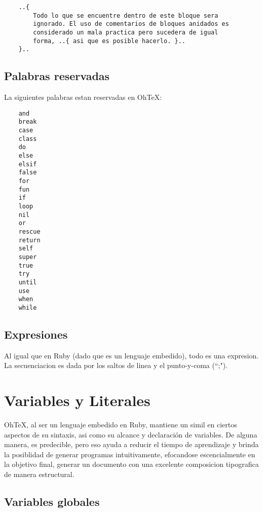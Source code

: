 \documentclass[12pt,letterpaper,titlepage,oneside,openright]{book}
\newcommand{\ohtex}{OhTeX}
\begin{document}
\begin{center}
\begin{lstlisting}
    ..{
        Todo lo que se encuentre dentro de este bloque sera
        ignorado. El uso de comentarios de bloques anidados es
        considerado un mala practica pero sucedera de igual
        forma, ..{ asi que es posible hacerlo. }..
    }..    
\end{lstlisting}
\end{center}

\subsection{Palabras reservadas}

La siguientes palabras estan reservadas en \ohtex:

\begin{center}
\begin{lstlisting}
    and
    break
    case
    class
    do
    else
    elsif
    false
    for
    fun
    if
    loop
    nil
    or
    rescue
    return
    self
    super
    true
    try
    until
    use
    when
    while
\end{lstlisting}
\end{center}

\subsection{Expresiones}

Al igual que en Ruby (dado que es un lenguaje embedido), todo es una expresion.
La secuenciacion es dada por los saltos de linea y el punto-y-coma (``;").

\section{Variables y Literales}

\ohtex, al ser un lenguaje embedido en Ruby, mantiene un simil en ciertos
aspectos de su sintaxis, asi como su alcance y declaración de variables. De
alguna manera, es predecible, pero eso ayuda a reducir el tiempo de aprendizaje
y brinda la posiblidad de generar programas intuitivamente, efocandose
escencialmente en la objetivo final, generar un documento con una excelente
composicion tipografica de manera estructural.

\subsection{Variables globales}
\end{document}
